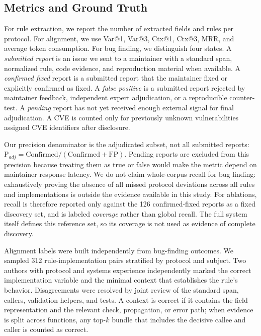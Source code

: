\subsection{Metrics and Ground Truth}

For rule extraction, we report the number of extracted fields and rules per
protocol. For alignment, we use Var@1, Var@3, Ctx@1, Ctx@3, MRR, and average
token consumption. For bug finding, we distinguish four states. A
\emph{submitted report} is an issue we sent to a maintainer with a standard
span, normalized rule, code evidence, and reproduction material when available.
A \emph{confirmed fixed} report is a submitted report that the maintainer fixed
or explicitly confirmed as fixed. A \emph{false positive} is a submitted report
rejected by maintainer feedback, independent expert adjudication, or a
reproducible counter-test. A \emph{pending} report has not yet received enough
external signal for final adjudication. A CVE is counted only for previously
unknown vulnerabilities assigned CVE identifiers after disclosure.

Our precision denominator is the adjudicated subset, not all submitted reports:
$\mathrm{P}_{adj}=\mathrm{Confirmed}/(\mathrm{Confirmed}+\mathrm{FP})$.
Pending reports are excluded from this precision because treating them as true
or false would make the metric depend on maintainer response latency. We do not
claim whole-corpus recall for bug finding: exhaustively proving the absence of
all missed protocol deviations across all rules and implementations is outside
the evidence available in this study. For ablations, recall is therefore
reported only against the 126 confirmed-fixed reports as a fixed discovery set,
and is labeled \emph{coverage} rather than global recall. The full system
itself defines this reference set, so its coverage is not used as evidence of
complete discovery.

Alignment labels were built independently from bug-finding outcomes. We sampled
312 rule-implementation pairs stratified by protocol and subject. Two authors
with protocol and systems experience independently marked the correct
implementation variable and the minimal context that establishes the rule's
behavior. Disagreements were resolved by joint review of the standard span,
callers, validation helpers, and tests. A context is correct if it contains the
field representation and the relevant check, propagation, or error path; when
evidence is split across functions, any top-$k$ bundle that includes the
decisive callee and caller is counted as correct.

